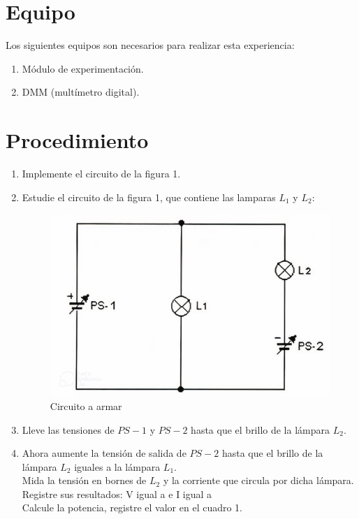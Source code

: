 \section{Equipo}
Los siguientes equipos son necesarios para realizar esta experiencia:
\begin{enumerate}
	\item Módulo de experimentación.
	\item DMM (multímetro digital).
\end{enumerate}
\section{Procedimiento}
\begin{enumerate}
	\item Implemente el circuito de la  figura 1.
	\item Estudie el circuito de la figura 1, que contiene las lamparas $L_{1}$ y $L_{2}$:
	\begin{figure}[h]
		\centering
		\includegraphics[scale=0.5]{imagenes/1}
		\caption{Circuito a armar}
	\end{figure}
	\item Lleve las tensiones de $PS-1$ y $PS-2$ hasta que el brillo de la lámpara $L_{2}$.
	\item Ahora aumente la tensión de salida de $PS-2$ hasta que el brillo de la lámpara $L_{2}$ iguales a la lámpara $L_{1}$.
	\\
	Mida la tensión en bornes de $L_{2}$ y la corriente que circula por dicha lámpara. 
	\\ Registre sus resultados: V igual a  e I igual a 
	\\ Calcule la potencia, registre el valor en el cuadro 1.
	\begin{table}[h]

\end{table}
\end{enumerate}
